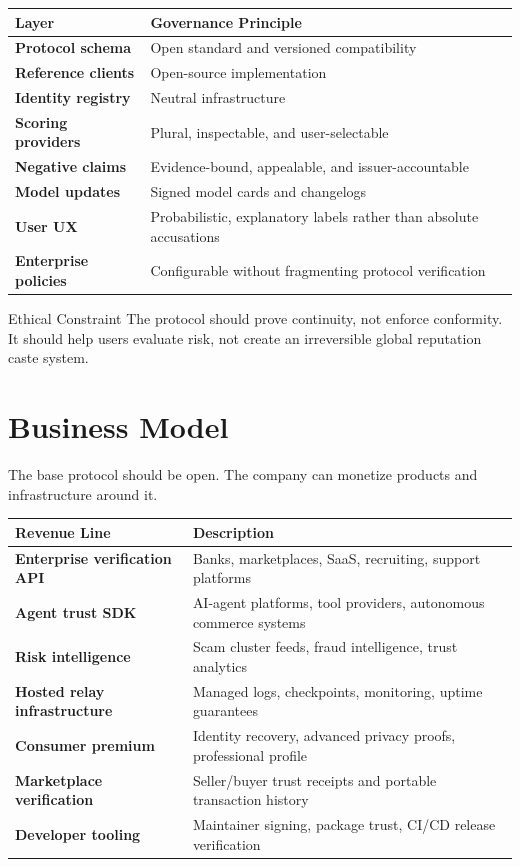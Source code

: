 \documentclass[11pt]{article}
\begin{document}
\begin{center}
\begin{tabularx}{\textwidth}{>{\bfseries}p{} X}
\toprule
Layer & Governance Principle \\
\midrule
Protocol schema & Open standard and versioned compatibility \\
Reference clients & Open-source implementation \\
Identity registry & Neutral infrastructure \\
Scoring providers & Plural, inspectable, and user-selectable \\
Negative claims & Evidence-bound, appealable, and issuer-accountable \\
Model updates & Signed model cards and changelogs \\
User UX & Probabilistic, explanatory labels rather than absolute accusations \\
Enterprise policies & Configurable without fragmenting protocol verification \\
\bottomrule
\end{tabularx}
\end{center}

\begin{warningbox}{Ethical Constraint}
The protocol should prove continuity, not enforce conformity. It should help users evaluate risk, not create an irreversible global reputation caste system.
\end{warningbox}

\section{Business Model}

The base protocol should be open. The company can monetize products and infrastructure around it.

\begin{center}
\begin{tabularx}{\textwidth}{>{\bfseries}p{} X}
\toprule
Revenue Line & Description \\
\midrule
Enterprise verification API & Banks, marketplaces, SaaS, recruiting, support platforms \\
Agent trust SDK & AI-agent platforms, tool providers, autonomous commerce systems \\
Risk intelligence & Scam cluster feeds, fraud intelligence, trust analytics \\
Hosted relay infrastructure & Managed logs, checkpoints, monitoring, uptime guarantees \\
Consumer premium & Identity recovery, advanced privacy proofs, professional profile \\
Marketplace verification & Seller/buyer trust receipts and portable transaction history \\
Developer tooling & Maintainer signing, package trust, CI/CD release verification \\
\bottomrule
\end{tabularx}
\end{center}
\end{document}
